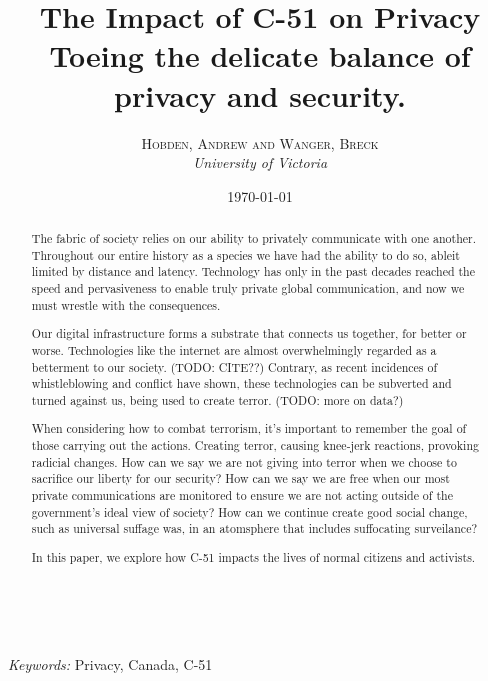 \documentclass[a4paper, 11pt]{article} %
\title{
    \textbf{The Impact of C-51 on Privacy}\\ %
    Toeing the delicate balance of privacy and security.
} %
\author{\textsc{Hobden, Andrew and Wanger, Breck} %
\\{\textit{University of Victoria}}} %
\date{\today} %
\makeatletter
\renewcommand{\maketitle}{ %
\begin{flushright} %
{\LARGE\@title} %

\vspace{50pt} %

{\large\@author} %
\\\@date %

\vspace{40pt} %
\end{flushright}
}
\makeatother
\begin{document}
\maketitle %



\begin{abstract}
The fabric of society relies on our ability to privately communicate with one another. Throughout our entire history as a species we have had the ability to do so, ableit limited by distance and latency. Technology has only in the past decades reached the speed and pervasiveness to enable truly private global communication, and now we must wrestle with the consequences.

Our digital infrastructure forms a substrate that connects us together, for better or worse. Technologies like the internet are almost overwhelmingly regarded as a betterment to our society. (TODO: CITE??) Contrary, as recent incidences of whistleblowing and conflict have shown, these technologies can be subverted and turned against us, being used to create terror. (TODO: more on data?)

When considering how to combat terrorism, it's important to remember the goal of those carrying out the actions. Creating terror, causing knee-jerk reactions, provoking radicial changes. How can we say we are not giving into terror when we choose to sacrifice our liberty for our security? How can we say we are free when our most private communications are monitored to ensure we are not acting outside of the government's ideal view of society? How can we continue create good social change, such as universal suffage was, in an atomsphere that includes suffocating surveilance?

In this paper, we explore how C-51 impacts the lives of normal citizens and activists.
\end{abstract}

\hspace*{3,6mm}\textit{Keywords:} Privacy, Canada, C-51 %

\vspace{30pt} %
\end{document}
